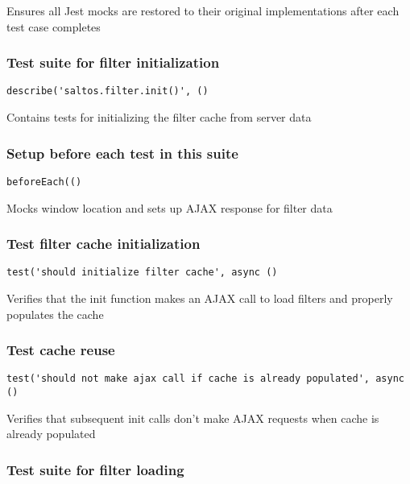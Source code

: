 \documentclass[a4paper]{article}
\begin{document}
Ensures all Jest mocks are restored to their original implementations
after each test case completes

\hypertarget{toc148}{}
\subsubsection{Test suite for filter initialization}

\begin{lstlisting}
describe('saltos.filter.init()', ()
\end{lstlisting}

Contains tests for initializing the filter cache from server data

\hypertarget{toc149}{}
\subsubsection{Setup before each test in this suite}

\begin{lstlisting}
beforeEach(()
\end{lstlisting}

Mocks window location and sets up AJAX response for filter data

\hypertarget{toc150}{}
\subsubsection{Test filter cache initialization}

\begin{lstlisting}
test('should initialize filter cache', async ()
\end{lstlisting}

Verifies that the init function makes an AJAX call to load filters
and properly populates the cache

\hypertarget{toc151}{}
\subsubsection{Test cache reuse}

\begin{lstlisting}
test('should not make ajax call if cache is already populated', async ()
\end{lstlisting}

Verifies that subsequent init calls don't make AJAX requests
when cache is already populated

\hypertarget{toc152}{}
\subsubsection{Test suite for filter loading}
\end{document}
